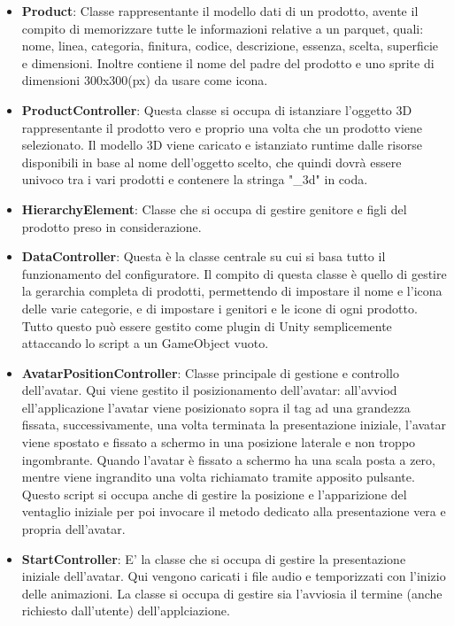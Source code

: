 \begin{itemize}
	\item \textbf{Product}: Classe rappresentante il modello dati di un prodotto, avente il compito di memorizzare tutte le informazioni relative a un parquet, quali: nome, linea, categoria, finitura, codice, descrizione, essenza, scelta, superficie e dimensioni. Inoltre contiene il nome del padre del prodotto e uno sprite di dimensioni 300x300(px) da usare come icona.
	
	\item \textbf{ProductController}: Questa classe si occupa di istanziare l'oggetto 3D rappresentante il prodotto vero e proprio una volta che un prodotto viene selezionato. Il modello 3D viene caricato e istanziato runtime dalle risorse disponibili in base al nome dell'oggetto scelto, che quindi dovr\`a essere univoco tra i vari prodotti e contenere la stringa "\_3d" in coda.
	
	\item \textbf{HierarchyElement}: Classe che si occupa di gestire genitore e figli del prodotto preso in considerazione.
	
	\item \textbf{DataController}: Questa \`e la classe centrale su cui si basa tutto il funzionamento del configuratore. Il compito di questa classe \`e quello di gestire la gerarchia completa di prodotti, permettendo di impostare il nome e l'icona delle varie categorie, e di impostare i genitori e le icone di ogni prodotto. Tutto questo pu\`o essere gestito come plugin di Unity semplicemente attaccando lo script a un GameObject vuoto.
	
	\item \textbf{AvatarPositionController}: Classe principale di gestione e controllo dell'avatar. Qui viene gestito il posizionamento dell'avatar: all'avviod ell'applicazione l'avatar viene posizionato sopra il tag ad una grandezza fissata, successivamente, una volta terminata la presentazione iniziale, l'avatar viene spostato e fissato a schermo in una posizione laterale e non troppo ingombrante. Quando l'avatar \`e fissato a schermo ha una scala posta a zero, mentre viene ingrandito una volta richiamato tramite apposito pulsante. Questo script si occupa anche di gestire la posizione e l'apparizione del ventaglio iniziale per poi invocare il metodo dedicato alla presentazione vera e propria dell'avatar.
	
	\item \textbf{StartController}: E' la classe che si occupa di gestire la presentazione iniziale dell'avatar. Qui vengono caricati i file audio e temporizzati con l'inizio delle animazioni. La classe si occupa di gestire sia l'avviosia il termine (anche richiesto dall'utente) dell'applciazione.
	

\end{itemize}
